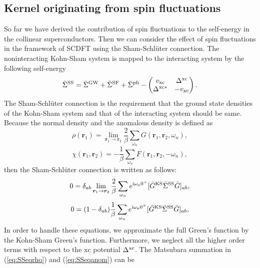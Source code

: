 \subsection{Kernel originating from spin fluctuations}
\label{kernelSF}
So far we have derived the contribution of spin fluctuations to the self-energy in the collinear superconductors.
Then we can consider the effect of spin fluctuations in the framework of SCDFT using the Sham-Schl\"{u}ter connection\cite{Sham1983,MarquesphD}.
The noninteracting Kohn-Sham system is mapped to the interacting system by the following self-energy
%
\begin{equation}
	\bar{\Sigma}^{\rm SS} = \bar{\Sigma}^{\rm GW} + \bar{\Sigma}^{\rm SF} + \bar{\Sigma}^{\rm ph}
	- 
	\begin{pmatrix}
		v_{\rm xc}  &   \Delta^{\rm xc}   \\
		\Delta^{\rm xc\ast}  &  -v_{\rm xc}
	\end{pmatrix}.
	\label{eq:SSself-energy}
\end{equation}
The Sham-Schl\"{u}ter connection is the requirement that the ground state densities of the Kohn-Sham
system and that of the interacting system should be same.
Because the normal density and the anomalous density is defined as 
%
\begin{equation}
	\rho(\bm r_1) = \lim_{\bm r_1 \to \bm r_2}
	\frac{2}{\beta}\sum_{\omega_n}G(\bm r_1,\bm r_2,\omega_n),
	\label{eq:normaldensity}
\end{equation}
%
\begin{equation}
	\chi(\bm r_1, \bm r_2) = - \frac{1}{\beta}\sum_{\omega_n}F(\bm r_1, \bm r_2, -\omega_n),
	\label{eq:anomdensity}
\end{equation}
%
then the Sham-Schl\"{u}ter connection is written as follows:
%
\begin{equation}
	0 = \delta_{ab}\lim_{\bm r_1 \to \bm r_2} \frac{2}{\beta} 
	\sum_{\omega_n}e^{\rm i\omega_n0^{+}}[\bar{G}^{\rm KS}\bar{\Sigma}^{\rm SS}\bar{G}]_{ab},
	\label{eq:SSeqrho}
\end{equation}
%
\begin{equation}
	0 = (1-\delta_{ab})\frac{1}{\beta}\sum_{\omega_n}
	e^{\rm i\omega_n0^{+}}[\bar{G}^{\rm KS}\bar{\Sigma}^{\rm SS}\bar{G}]_{ab},
	\label{eq:SSeqanom}
\end{equation}
%
In order to handle these equations, we approximate the full Green's function by the Kohn-Sham
Green's function. Furthermore, we neglect all the higher order terms with respect to the xc potential
$\Delta^{\rm xc}$. The Matsubara summation in (\ref{eq:SSeqrho}) and (\ref{eq:SSeqanom}) can be
